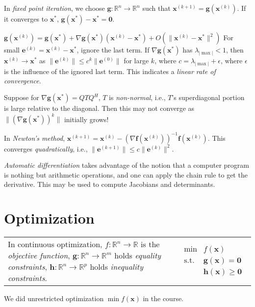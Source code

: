 \documentclass[landscape,10pt,letterpaper]{article}
\newcommand{\heading}[1]{\vspace{-1.5em} \section*{#1} \vspace{-1.0em}}
\newcommand{\subheading}[1]{\vspace{-1.2em} \subsection*{#1} \vspace{-0.8em}}
\newcommand{\maxeigenvalue}{\lambda_{| \max |}}
\begin{document}
\begin{multicols}{4}

In \emph{fixed point iteration}, we choose $\mathbf{g} : \mathbb{R}^n \to \mathbb{R}^n$ such that $\mathbf{x}^{(k+1)} = \mathbf{g}(\mathbf{x}^{(k)})$.  If it converges to $\mathbf{x}^*$, $\mathbf{g}(\mathbf{x}^*) - \mathbf{x}^* = \mathbf{0}$.

$\mathbf{g}(\mathbf{x}^{(k)}) = \mathbf{g}(\mathbf{x}^*) + \nabla \mathbf{g}(\mathbf{x}^*)(\mathbf{x}^{(k)} - \mathbf{x}^*) + O( \| \mathbf{x}^{(k)} - \mathbf{x}^* \|^2 )$
For small $\mathbf{e}^{(k)} = \mathbf{x}^{(k)} - \mathbf{x}^*$, ignore the last term.  If $\nabla \mathbf{g}(\mathbf{x}^*)$ has $\maxeigenvalue < 1$, then $\mathbf{x}^{(k)} \to \mathbf{x}^*$ as $\| \mathbf{e}^{(k)} \| \leq c^k \| \mathbf{e}^{(0)} \|$ for large $k$, where $c = \maxeigenvalue + \epsilon$, where $\epsilon$ is the influence of the ignored last term.  This indicates a \emph{linear rate of convergence}.

Suppose for $\nabla \mathbf{g}(\mathbf{x}^*) = QTQ^H$, $T$ is \emph{non-normal}, i.e., $T$'s superdiagonal portion is large relative to the diagonal.  Then this may not converge as $\| (\nabla \mathbf{g}(\mathbf{x}^*))^k \|$ initially grows!


In \emph{Newton's method}, $\mathbf{x}^{(k+1)} = \mathbf{x}^{(k)} - ( \nabla \mathbf{f}(\mathbf{x}^{(k)}) )^{-1} \mathbf{f}(\mathbf{x}^{(k)})$.  This converges \emph{quadratically}, i.e., $\| \mathbf{e}^{(k+1)} \| \leq c \| \mathbf{e}^{(k)} \|^2$.

\emph{Automatic differentiation} takes advantage of the notion that a computer program is nothing but arithmetic operations, and one can apply the chain rule to get the derivative.  This may be used to compute Jacobians and determinants.

\heading{Optimization}

\hspace{-0.65em} \begin{tabular}{p{0.7\linewidth}@{}p{0.3\linewidth}}
In continuous optimization, $f : \mathbb{R}^n \to \mathbb{R}$ is the \emph{objective function}, $\mathbf{g} : \mathbb{R}^n \to \mathbb{R}^m$ holds \emph{equality constraints}, $\mathbf{h} : \mathbb{R}^n \to \mathbb{R}^p$ holds \emph{inequality constraints}. & \vspace{-0.5em} \hspace{1.0em} $\begin{array}{rl}
\mbox{min} & f(\mathbf{x}) \\
\mbox{s.t.} & \mathbf{g}(\mathbf{x}) = \mathbf{0} \\
& \mathbf{h}(\mathbf{x}) \geq \mathbf{0} \end{array}$
\end{tabular}
We did unrestricted optimization $\min f(\mathbf{x})$ in the course.


\end{multicols}
\end{document}
